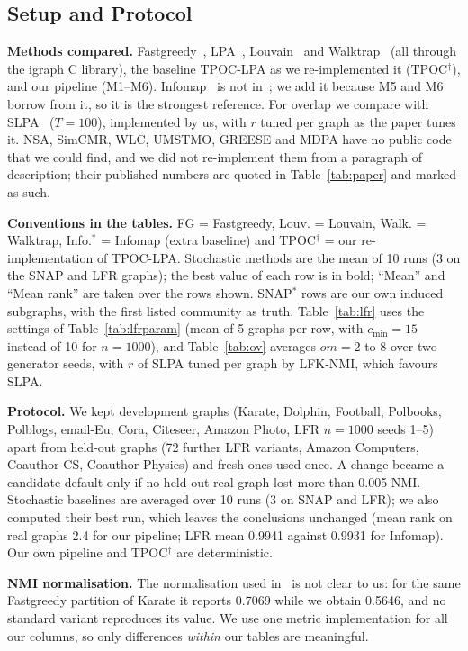 \documentclass[conference]{IEEEtran}
\begin{document}
\subsection{Setup and Protocol}\label{sec:setup}
\textbf{Methods compared.} Fastgreedy~\cite{clauset2004}, LPA~\cite{raghavan2007}, Louvain~\cite{blondel2008} and Walktrap~\cite{pons2006} (all through the igraph C library), the baseline TPOC-LPA as we re-implemented it (TPOC$^{\dagger}$), and our pipeline (M1--M6). Infomap~\cite{rosvall2008} is not in~\cite{kong2026}; we add it because M5 and M6 borrow from it, so it is the strongest reference. For overlap we compare with SLPA~\cite{xie2011} ($T{=}100$), implemented by us, with $r$ tuned per graph as the paper tunes it. NSA, SimCMR, WLC, UMSTMO, GREESE and MDPA have no public code that we could find, and we did not re-implement them from a paragraph of description; their published numbers are quoted in Table~\ref{tab:paper} and marked as such.

\textbf{Conventions in the tables.} FG = Fastgreedy, Louv. = Louvain, Walk. = Walktrap, Info.$^{*}$ = Infomap (extra baseline) and TPOC$^{\dagger}$ = our re-implementation of TPOC-LPA. Stochastic methods are the mean of 10 runs (3 on the SNAP and LFR graphs); the best value of each row is in bold; ``Mean'' and ``Mean rank'' are taken over the rows shown. SNAP$^{*}$ rows are our own induced subgraphs, with the first listed community as truth. Table~\ref{tab:lfr} uses the settings of Table~\ref{tab:lfrparam} (mean of 5 graphs per row, with $c_{\min}{=}15$ instead of 10 for $n{=}1000$), and Table~\ref{tab:ov} averages $om=2$ to 8 over two generator seeds, with $r$ of SLPA tuned per graph by LFK-NMI, which favours SLPA.

\textbf{Protocol.} We kept development graphs (Karate, Dolphin, Football, Polbooks, Polblogs, email-Eu, Cora, Citeseer, Amazon Photo, LFR $n{=}1000$ seeds 1--5) apart from held-out graphs (72 further LFR variants, Amazon Computers, Coauthor-CS, Coauthor-Physics) and fresh ones used once. A change became a candidate default only if no held-out real graph lost more than 0.005 NMI. Stochastic baselines are averaged over 10 runs (3 on SNAP and LFR); we also computed their best run, which leaves the conclusions unchanged (mean rank on real graphs 2.4 for our pipeline; LFR mean 0.9941 against 0.9931 for Infomap). Our own pipeline and TPOC$^{\dagger}$ are deterministic.

\textbf{NMI normalisation.} The normalisation used in~\cite{kong2026} is not clear to us: for the same Fastgreedy partition of Karate it reports 0.7069 while we obtain 0.5646, and no standard variant reproduces its value. We use one metric implementation for all our columns, so only differences \emph{within} our tables are meaningful.
\end{document}
